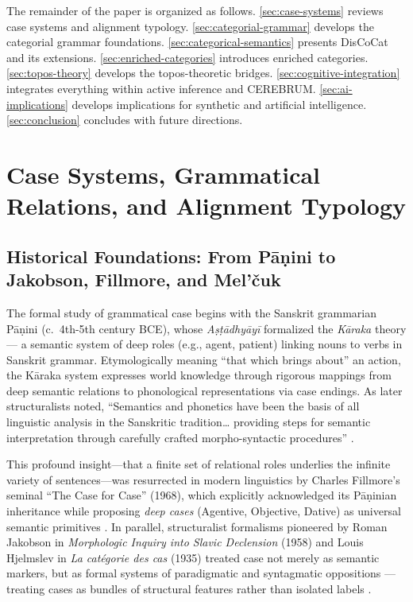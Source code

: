 \documentclass[
]{article}
\numberwithin{equation}{section}
\begin{document}
The remainder of the paper is organized as follows.
\autoref{sec:case-systems} reviews case systems and alignment typology.
\autoref{sec:categorial-grammar} develops the categorial grammar
foundations. \autoref{sec:categorical-semantics} presents DisCoCat and
its extensions. \autoref{sec:enriched-categories} introduces enriched
categories. \autoref{sec:topos-theory} develops the topos-theoretic
bridges. \autoref{sec:cognitive-integration} integrates everything
within active inference and CEREBRUM. \autoref{sec:ai-implications}
develops implications for synthetic and artificial intelligence.
\autoref{sec:conclusion} concludes with future directions.

\newpage

\section{Case Systems, Grammatical Relations, and Alignment
Typology}\label{sec:case-systems}

\subsection{Historical Foundations: From Pāṇini to Jakobson, Fillmore,
and
Mel'čuk}\label{historical-foundations-from-pux101ux1e47ini-to-jakobson-fillmore-and-melux10duk}

The formal study of grammatical case begins with the Sanskrit grammarian
Pāṇini (c.~4th-5th century BCE), whose \emph{Aṣṭādhyāyī} formalized the
\emph{Kāraka} theory --- a semantic system of deep roles (e.g., agent,
patient) linking nouns to verbs in Sanskrit grammar. Etymologically
meaning ``that which brings about'' an action, the Kāraka system
expresses world knowledge through rigorous mappings from deep semantic
relations to phonological representations via case endings. As later
structuralists noted, ``Semantics and phonetics have been the basis of
all linguistic analysis in the Sanskritic tradition\ldots{} providing
steps for semantic interpretation through carefully crafted
morpho-syntactic procedures''
\citetext{\citeyear{jha2021sanskrit}; \citeyear{kak1987paninian}}.

This profound insight---that a finite set of relational roles underlies
the infinite variety of sentences---was resurrected in modern
linguistics by Charles Fillmore's seminal ``The Case for Case'' (1968),
which explicitly acknowledged its Pāṇinian inheritance while proposing
\emph{deep cases} (Agentive, Objective, Dative) as universal semantic
primitives \citeyearpar{fillmore1968case}. In parallel, structuralist
formalisms pioneered by Roman Jakobson in \emph{Morphologic Inquiry into
Slavic Declension} (1958) and Louis Hjelmslev in \emph{La catégorie des
cas} (1935) treated case not merely as semantic markers, but as formal
systems of paradigmatic and syntagmatic oppositions --- treating cases
as bundles of structural features rather than isolated labels
\citetext{\citeyear{jakobson1958morphologic}; \citeyear{hjelmslev1935categorie}}.
\end{document}
